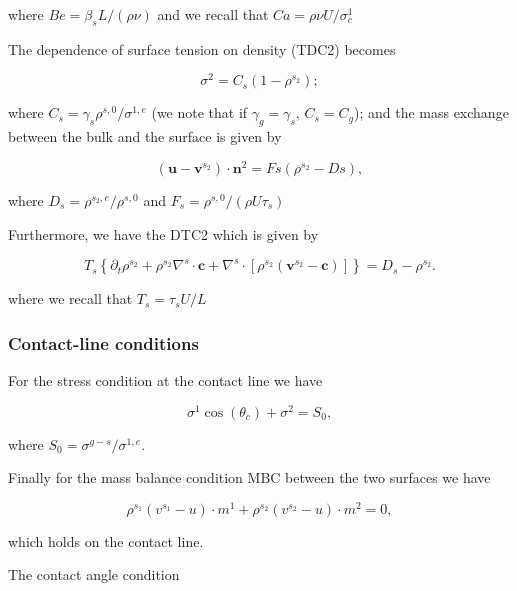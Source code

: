 \documentclass{article}
\begin{document}
where \(B e = \beta_{s}L / (\rho \nu)\) and we recall that \(C a = \rho \nu U / \sigma_{c}^{1}\)

The dependence of surface tension on density (TDC2) becomes

\begin{equation}
\sigma^2 = C_s(1 - \rho^{s_2}); \tag{2.54}
\end{equation}

where \(C_{s} = \gamma_{s}\rho^{s,0} / \sigma^{1,e}\) (we note that if \(\gamma_{g} = \gamma_{s}\), \(C_{s} = C_{g}\)); and the mass exchange between the bulk and the surface is given by

\begin{equation}
(\pmb {u} - \pmb{v}^{s_2})\cdot \pmb{n}^2 = Fs(\rho^{s_2} - Ds), \tag{2.55}
\end{equation}

where \(D_{s} = \rho^{s_2,e} / \rho^{s,0}\) and \(F_{s} = \rho^{s,0} / (\rho U\tau_{s})\)

Furthermore, we have the DTC2 which is given by

\begin{equation}
T_{s}\left\{\partial_{t}\rho^{s_{2}} + \rho^{s_{2}}\nabla^{s}\cdot \pmb {c} + \nabla^{s}\cdot [\rho^{s_{2}}(\pmb{v}^{s_{2}} - \pmb {c})]\right\} = D_{s} - \rho^{s_{2}}. \tag{2.56}
\end{equation}

where we recall that \(T_{s} = \tau_{s}U / L\)

\subsubsection{Contact-line conditions}

For the stress condition at the contact line we have

\begin{equation}
\sigma^{1}\cos (\theta_{c}) + \sigma^{2} = S_{0}, \tag{2.57}
\end{equation}

where \(S_{0} = \sigma^{g - s} / \sigma^{1,e}\).

Finally for the mass balance condition MBC between the two surfaces we have

\begin{equation}
\rho^{s_1}(v^{s_1} - u)\cdot m^1 +\rho^{s_2}(v^{s_2} - u)\cdot m^2 = 0, \tag{2.58}
\end{equation}

which holds on the contact line.

The contact angle condition
\end{document}
